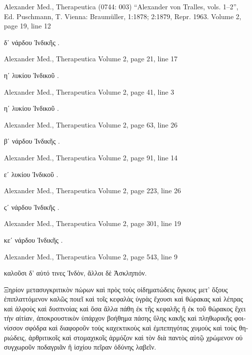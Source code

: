 \documentclass[12pt,letterpaper,twoside,final]{memoir}
\begin{document}
\begin{greek}
Alexander Med., Therapeutica (0744: 003)
“Alexander von Tralles, vols. 1–2”, Ed. Puschmann, T.
Vienna: Braumüller, 1:1878; 2:1879, Repr. 1963.
Volume 2, page 19, line 12

                                     δʹ 
νάρδου Ἰνδικῆς . 



Alexander Med., Therapeutica 
Volume 2, page 21, line 17

                                       ηʹ 
λυκίου Ἰνδικοῦ . 



Alexander Med., Therapeutica 
Volume 2, page 41, line 3

                                                   ηʹ 
λυκίου Ἰνδικοῦ . 



Alexander Med., Therapeutica 
Volume 2, page 63, line 26

                                                   βʹ 
νάρδου Ἰνδικῆς . 



Alexander Med., Therapeutica 
Volume 2, page 91, line 14

                                          εʹ 
λυκίου Ἰνδικοῦ . 



Alexander Med., Therapeutica 
Volume 2, page 223, line 26

                                    ϛʹ 
νάρδου Ἰνδικῆς . 



Alexander Med., Therapeutica 
Volume 2, page 301, line 19

                                             κεʹ 
νάρδου Ἰνδικῆς . 



Alexander Med., Therapeutica 
Volume 2, page 543, line 9

                                     καλοῦσι δ' αὐτό τινες Ἰνδὸν, ἄλλοι δὲ Ἀσκληπιόν.


 Ξηρίον μετασυγκριτικὸν πώρων καὶ πρὸς τοὺς οἰδηματώδεις ὄγκους 
μετ' ὄξους ἐπιπλαττόμενον καλῶς ποιεῖ καὶ τοῖς κεφαλὰς ὑγρὰς ἔχουσι 
καὶ θώρακας καὶ λέπρας καὶ ἀλφοὺς καὶ δυσπνοίας καὶ ὅσα ἄλλα πάθη 
ἐκ τῆς κεφαλῆς ἢ ἐκ τοῦ θώρακος ἔχει τὴν αἰτίαν, ἀποκρουστικὸν ὑπάρχον 
βοήθημα πάσης ὕλης κακῆς καὶ πληθωρικῆς φοινίσσον σφόδρα καὶ διαφοροῦν 
τοὺς καχεκτικοὺς καὶ ἐμπεπηγότας χυμοὺς καὶ τοὺς θηριώδεις, ἀρθριτικοῖς 
καὶ στομαχικοῖς ἁρμόζον καὶ τὸν διὰ παντὸς αὐτῷ χρώμενον οὐ συγχωροῦν 
ποδαγριᾶν ἢ ἰσχίου πεῖραν ὀδύνης λαβεῖν. 




\end{greek}
\end{document}
